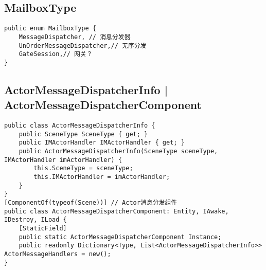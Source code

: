 \documentclass[9pt, b5paper]{article}
\begin{document}
\subsection{MailboxType}
\label{sec-7-11}
\begin{verbatim}
public enum MailboxType {
    MessageDispatcher, // 消息分发器
    UnOrderMessageDispatcher,// 无序分发
    GateSession,// 网关？
}
\end{verbatim}

\subsection{ActorMessageDispatcherInfo | ActorMessageDispatcherComponent}
\label{sec-7-12}
\begin{verbatim}
public class ActorMessageDispatcherInfo {
    public SceneType SceneType { get; }
    public IMActorHandler IMActorHandler { get; }
    public ActorMessageDispatcherInfo(SceneType sceneType, IMActorHandler imActorHandler) {
        this.SceneType = sceneType;
        this.IMActorHandler = imActorHandler;
    }
}
[ComponentOf(typeof(Scene))] // Actor消息分发组件
public class ActorMessageDispatcherComponent: Entity, IAwake, IDestroy, ILoad {
    [StaticField]
    public static ActorMessageDispatcherComponent Instance;
    public readonly Dictionary<Type, List<ActorMessageDispatcherInfo>> ActorMessageHandlers = new();
}
\end{verbatim}
\end{document}
